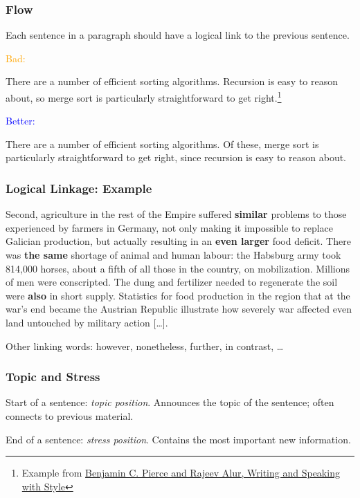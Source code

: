 \documentclass[xetex]{beamer}
\newcommand{\bad}[1]{\textcolor{orange}{#1}}
\newcommand{\good}[1]{\textcolor{blue}{#1}}
\begin{document}
\begin{frame}
  \frametitle{Flow}

  Each sentence in a paragraph should have a logical link to the previous sentence.

  \medskip
  \pause

  \bad{Bad:}

  {
    \small
    There are a number of efficient sorting algorithms.
    Recursion is easy to reason about, so merge sort is particularly straightforward to get right.\footnote{Example from \href{https://docs.google.com/document/d/1_vBXbugoLjO171w3wovs3ugmRQI-O6EcSVFDBF7eUzE/edit}{Benjamin C. Pierce and Rajeev Alur, Writing and Speaking with Style}}
  }

  \medskip
  \pause

  \good{Better:}

  {
    \small
    There are a number of efficient sorting algorithms.
    Of these, merge sort is particularly straightforward to get right, since recursion is easy to reason about.
  }
\end{frame}

\begin{frame}
  \frametitle{Logical Linkage: Example}

  {
  \small
  Second, agriculture in the rest of the Empire suffered \textbf{similar} problems to those experienced by farmers in Germany, not only making it impossible to replace Galician production, but actually resulting in an \textbf{even larger} food deficit.
  There was \textbf{the same} shortage of animal and human labour: the Habsburg army took 814,000 horses, about a fifth of all those in the country, on mobilization.
  Millions of men were conscripted.
  The dung and fertilizer needed to regenerate the soil were \textbf{also} in short supply.
  Statistics for food production in the region that at the war's end became the Austrian Republic illustrate how severely war affected even land untouched by military action [\dots].
  }

  \medskip

  Other linking words: however, nonetheless, further, in contrast, \dots
\end{frame}

\begin{frame}
  \frametitle{Topic and Stress}

  Start of a sentence: \emph{topic position}.
  Announces the topic of the sentence; often connects to previous material.

  \medskip

  End of a sentence: \emph{stress position}.
  Contains the most important new information.
\end{frame}
\end{document}
